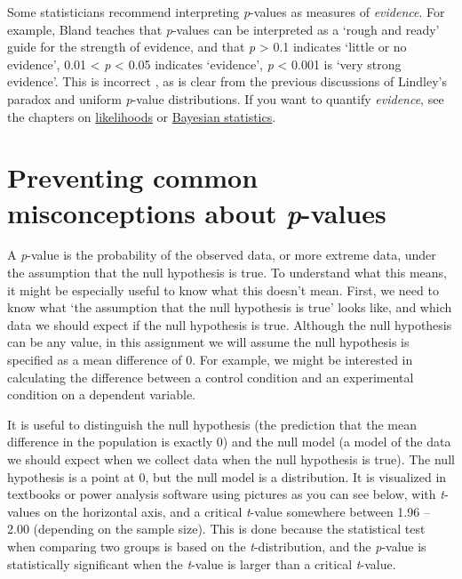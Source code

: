 \documentclass[
  oneside]{krantz}
\begin{document}
Some statisticians recommend interpreting \emph{p}-values as measures of \emph{evidence}. For example, Bland \citeyearpar{bland_introduction_2015} teaches that \emph{p}-values can be interpreted as a `rough and ready' guide for the strength of evidence, and that \emph{p} \textgreater{} 0.1 indicates `little or no evidence', 0.01 \textless{} \emph{p} \textless{} 0.05 indicates `evidence', \emph{p} \textless{} 0.001 is `very strong evidence'. This is incorrect \citep{lakens_why_2022}, as is clear from the previous discussions of Lindley's paradox and uniform \emph{p}-value distributions. If you want to quantify \emph{evidence}, see the chapters on \protect\hyperlink{likelihoods}{likelihoods} or \protect\hyperlink{bayes}{Bayesian statistics}.

\hypertarget{misconceptions}{%
\section{\texorpdfstring{Preventing common misconceptions about \emph{p}-values}{Preventing common misconceptions about p-values}}\label{misconceptions}}

A \emph{p}-value is the probability of the observed data, or more extreme data, under the assumption that the null hypothesis is true. To understand what this means, it might be especially useful to know what this doesn't mean. First, we need to know what `the assumption that the null hypothesis is true' looks like, and which data we should expect if the null hypothesis is true. Although the null hypothesis can be any value, in this assignment we will assume the null hypothesis is specified as a mean difference of 0. For example, we might be interested in calculating the difference between a control condition and an experimental condition on a dependent variable.

It is useful to distinguish the null hypothesis (the prediction that the mean difference in the population is exactly 0) and the null model (a model of the data we should expect when we collect data when the null hypothesis is true). The null hypothesis is a point at 0, but the null model is a distribution. It is visualized in textbooks or power analysis software using pictures as you can see below, with \emph{t}-values on the horizontal axis, and a critical \emph{t}-value somewhere between 1.96 -- 2.00 (depending on the sample size). This is done because the statistical test when comparing two groups is based on the \emph{t}-distribution, and the \emph{p}-value is statistically significant when the \emph{t}-value is larger than a critical \emph{t}-value.
\end{document}
